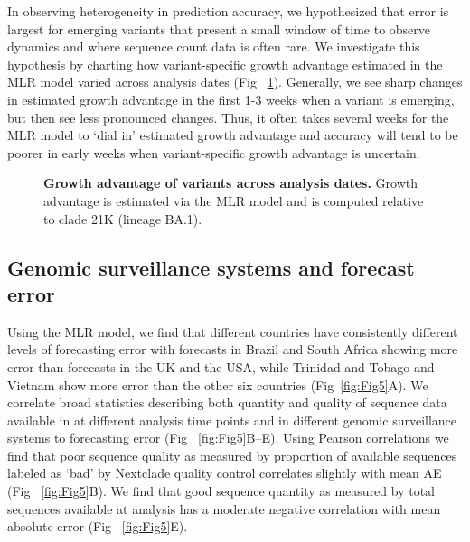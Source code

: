\documentclass[10pt,letterpaper]{article}
\begin{document}
In observing heterogeneity in prediction accuracy, we hypothesized that error is largest for emerging variants that present a small window of time to observe dynamics and where sequence count data is often rare.
We investigate this hypothesis by charting how variant-specific growth advantage estimated in the MLR model varied across analysis dates (Fig ~\ref{fig:Fig4}).
Generally, we see sharp changes in estimated growth advantage in the first 1-3 weeks when a variant is emerging, but then see less pronounced changes.
Thus, it often takes several weeks for the MLR model to `dial in' estimated growth advantage and accuracy will tend to be poorer in early weeks when variant-specific growth advantage is uncertain.



\begin{figure}[tb!]
	\centering
	\caption{
		\textbf{Growth advantage of variants across analysis dates.}
		Growth advantage is estimated via the MLR model and is computed relative to clade 21K (lineage BA.1).
	}
	\label{fig:Fig4}
\end{figure}





\subsection*{Genomic surveillance systems and forecast error}

Using the MLR model, we find that different countries have consistently different levels of forecasting error with forecasts in Brazil and South Africa showing more error than forecasts in the UK and the USA, while Trinidad and Tobago and Vietnam show more error than the other six countries (Fig~\ref{fig:Fig5}A).
We correlate broad statistics describing both quantity and quality of sequence data available in at different analysis time points and in different genomic surveillance systems to forecasting error (Fig ~\ref{fig:Fig5}B--E).
Using Pearson correlations we find that poor sequence quality as measured by proportion of available sequences labeled as `bad' by Nextclade quality control \cite{aksamentov2021nextclade} correlates slightly with mean AE (Fig ~\ref{fig:Fig5}B).
We find that good sequence quantity as measured by total sequences available at analysis has a moderate negative correlation with mean absolute error (Fig ~\ref{fig:Fig5}E).
\end{document}
